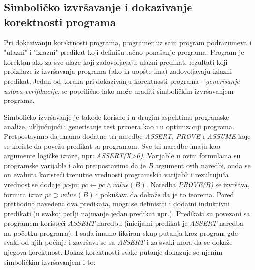 \documentclass[a4paper]{article}
\begin{document}
{\subsection{Simboličko izvršavanje i dokazivanje korektnosti programa}
\label{subsec:podnaslovN}


Pri dokazivanju korektnosti programa, programer uz sam program podrazumeva i "ulazni" i "izlazni" predikat koji  definišu tačno ponašanje programa. Program je korektan ako za sve ulaze koji zadovoljavaju ulazni predikat, rezultati koji proizilaze iz izvršavanja programa (ako ih uopšte ima) zadovoljavaju izlazni predikat. Jedan od koraka pri dokazivanju korektnosti programa - \textit{generisanje uslova verifikacije}, se poprilično lako može uraditi simboličkim izvršavanjem programa.

Simboličko izvršavanje je takođe korisno i u drugim aspektima programske analize, uključujući i generisanje test primera kao i u optimizaciji programa. Pretpostavimo da imamo dodatne tri naredbe \textit{ASSERT}, \textit{PROVE} i \textit{ASSUME} koje se koriste da povežu predikat sa programom. Sve tri naredbe imaju kao argumente logičke izraze, npr: \textit{ASSERT(X>0)}. Varijable u ovim formulama su programske varijable i ako pretpostavimo da je \textit{B} argument ovih naredbi, onda se on evaluira koristeći trenutne vrednosti programskih varijabli i rezultujuća vrednost se dodaje \textit{pc}-ju: $pc \gets pc \wedge value (B)$. Naredba \textit{PROVE(B)} se izvršava, formira izraz $pc \supset value(B)$ i pokušava da dokaže da je to teorema. Pored prethodno navedena dva predikata, mogu se definisati i dodatni induktivni predikati (u svakoj petlji najmanje jedan predikat npr.). Predikati su povezani sa programom koristeći \textit{ASSERT} naredbu (inicijalni predikat je \textit{ASSERT} naredba na početku programa). I sada imamo fiksiran skup putanja kroz program gde svaki od njih počinje i završava se sa \textit{ASSERT} i za svaki mora da se dokaže njegova korektnost. Dokaz korektnosti svake putanje dokazuje se njenim simboličkim izvršavanjem i to:

}
\end{document}
